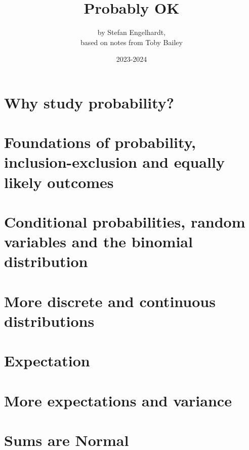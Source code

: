 \documentclass[12pt,a4paper]{article}
\title{Probably OK}
\author{by Stefan Engelhardt, \\ based on notes from Toby Bailey}
\date{2023-2024}
\newcommand{\1}{\mathbbm{1}}
\begin{document}
\maketitle
\setcounter{tocdepth}{2}
\tableofcontents 

\section{Why study probability?} 


\section{Foundations of probability, inclusion-exclusion and equally likely outcomes} \label{s1} 




\section{Conditional probabilities, random variables and the binomial distribution}






\section{More discrete and continuous distributions}






\section{Expectation}




\section{More expectations and variance}



\section{Sums are Normal}

\end{document}

